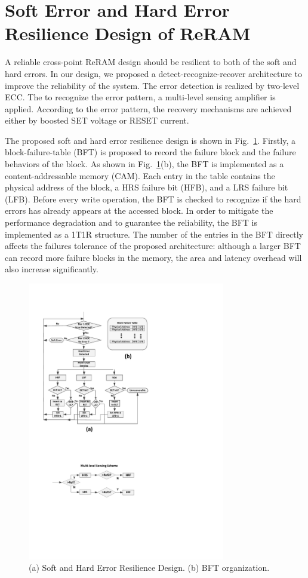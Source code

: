 \section{Soft Error and Hard Error Resilience Design of ReRAM} \label{sec:arch}
A reliable cross-point ReRAM design should be resilient to both of the soft and hard errors. In our design, we proposed a detect-recognize-recover architecture to improve the reliability of the system. The error detection is realized by two-level ECC. The to recognize the error pattern, a multi-level sensing amplifier is applied. According to the error pattern, the recovery mechanisms are achieved either by boosted SET voltage or RESET current.

The proposed soft and hard error resilience design is shown in Fig.~\ref{fig:arch}. Firstly, a block-failure-table (BFT) is proposed to record the failure block and the failure behaviors of the block. As shown in Fig.~\ref{fig:arch}(b), the BFT is implemented as a content-addressable memory (CAM). Each entry in the table contains the physical address of the block, a HRS failure bit (HFB), and a LRS failure bit (LFB). Before every write operation, the BFT is checked to recognize if the hard errors has already appears at the accessed block. In order to mitigate the performance degradation and to guarantee the reliability, the BFT is implemented as a 1T1R structure. The number of the entries in the BFT directly affects the failures tolerance of the proposed architecture: although a larger BFT can record more failure blocks in the memory, the area and latency overhead will also increase significantly.


\begin{figure}[!t]
\centering
    \includegraphics[width=3.4in]{./fig/arch.pdf}
\caption{(a) Soft and Hard Error Resilience Design. (b) BFT organization.}
\label{fig:arch}
\end{figure}

